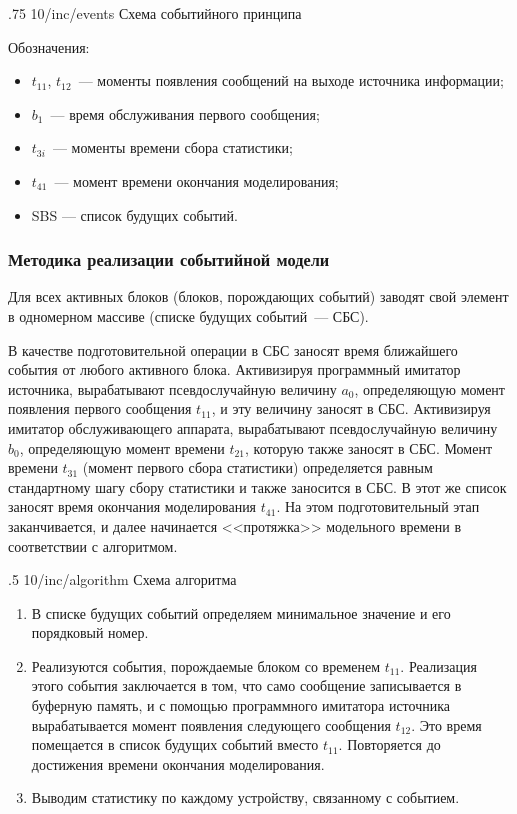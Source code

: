 \image
{.75\textwidth}
{10/inc/events}
{Схема событийного принципа}

Обозначения:

\begin{itemize}
    \item $t_{11}$, $t_{12}$~--- моменты появления сообщений на выходе источника информации;
    \item $b_1$~--- время обслуживания первого сообщения;
    \item $t_{3i}$~--- моменты времени сбора статистики;
    \item $t_{41}$~--- момент времени окончания моделирования;
    \item SBS --- список будущих событий.
\end{itemize}

\subsubsection{Методика реализации событийной модели}

Для всех активных блоков (блоков, порождающих событий) заводят свой элемент
в одномерном массиве (списке будущих событий~--- СБС).

В качестве подготовительной операции в СБС заносят время ближайшего события от любого активного блока. Активизируя программный имитатор источника, вырабатывают псевдослучайную величину $a_0$, определяющую момент появления первого сообщения $t_{11}$, и эту величину заносят в СБС. Активизируя имитатор обслуживающего аппарата, вырабатывают псевдослучайную величину $b_0$, определяющую момент времени $t_{21}$, которую также заносят в СБС. Момент времени $t_{31}$ (момент первого сбора статистики) определяется равным стандартному шагу сбору статистики и также заносится в СБС. В этот же список заносят время окончания моделирования $t_{41}$. На этом подготовительный этап заканчивается, и далее начинается <<протяжка>> модельного времени в соответствии с алгоритмом.

\image
{.5\textwidth}
{10/inc/algorithm}
{Схема алгоритма}

\begin{enumerate}
    \item В списке будущих событий определяем минимальное значение и его порядковый номер.
    \item Реализуются события, порождаемые блоком со временем $t_{11}$. Реализация этого события заключается в том, что само сообщение записывается в буферную память, и с помощью программного имитатора источника вырабатывается момент появления следующего сообщения $t_{12}$. Это время помещается в список будущих событий вместо $t_{11}$. Повторяется до достижения времени окончания моделирования.
    \item Выводим статистику по каждому устройству, связанному с событием.
\end{enumerate}

